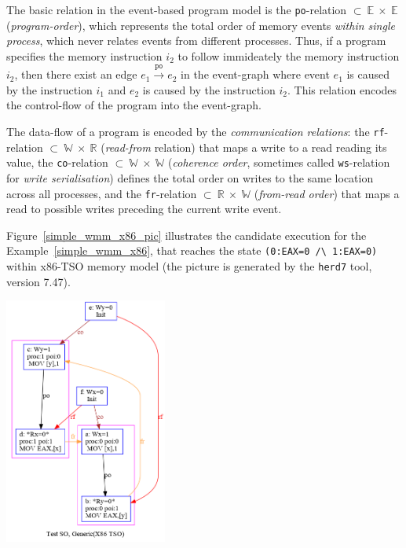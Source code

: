 The basic relation in the event-based program model is the \texttt{po}-relation $\subset~\mathbb{E}~\times~\mathbb{E}$ (\textit{program-order}), which represents the total order of memory events \textit{within single process}, which never relates events from different processes. Thus, if a program specifies the memory instruction $i_2$ to follow immideately the memory instruction $i_2$, then there exist an edge $e_1 \xrightarrow{\texttt{po}} e_2$ in the event-graph where event $e_1$ is caused by the instruction $i_1$ and $e_2$ is caused by the instruction $i_2$. This relation encodes the control-flow of the program into the event-graph.

The data-flow of a program is encoded by the \textit{communication relations}: the \texttt{rf}-relation $\subset~\mathbb{W}~\times~\mathbb{R}$ (\textit{read-from} relation) that maps a write to a read reading its value, the \texttt{co}-relation $\subset~\mathbb{W}~\times~\mathbb{W}$ (\textit{coherence order}, sometimes called \texttt{ws}-relation for \textit{write serialisation}) defines the total order on writes to the same location across all processes, and the \texttt{fr}-relation $\subset~\mathbb{R}~\times~\mathbb{W}$ (\textit{from-read order}) that maps a read to possible writes preceding the current write event.

Figure~\ref{simple_wmm_x86_pic} illustrates the candidate execution for the Example~\ref{simple_wmm_x86}, that reaches the state \texttt{(0:EAX=0~/\textbackslash~1:EAX=0)} within x86-TSO memory model (the picture is generated by the \texttt{herd7} tool, version 7.47). 

\includegraphics[width=0.4\textwidth]{img/my/simple_wmm_x86.png}
\label{simple_wmm_x86_pic}

